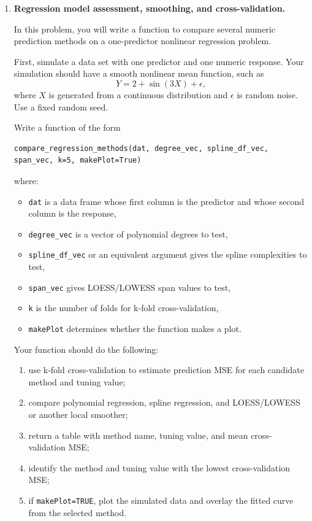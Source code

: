 \documentclass[11pt]{article}
\begin{document}
\begin{enumerate}

\item \textbf{Regression model assessment, smoothing, and cross-validation.}

In this problem, you will write a function to compare several numeric prediction methods on a one-predictor nonlinear regression problem.

First, simulate a data set with one predictor and one numeric response. Your simulation should have a smooth nonlinear mean function, such as
\[
Y = 2 + \sin(3X) + \epsilon,
\]
where \(X\) is generated from a continuous distribution and \(\epsilon\) is random noise. Use a fixed random seed.

Write a function of the form

\begin{lstlisting}
compare_regression_methods(dat, degree_vec, spline_df_vec, span_vec, k=5, makePlot=True)
\end{lstlisting}

where:

\begin{itemize}
    \item \texttt{dat} is a data frame whose first column is the predictor and whose second column is the response,
    \item \texttt{degree\_vec} is a vector of polynomial degrees to test,
    \item \texttt{spline\_df\_vec} or an equivalent argument gives the spline complexities to test,
    \item \texttt{span\_vec} gives LOESS/LOWESS span values to test,
    \item \texttt{k} is the number of folds for k-fold cross-validation,
    \item \texttt{makePlot} determines whether the function makes a plot.
\end{itemize}

Your function should do the following:

\begin{enumerate}[label=(\alph*)]
    \item use k-fold cross-validation to estimate prediction MSE for each candidate method and tuning value;
    \item compare polynomial regression, spline regression, and LOESS/LOWESS or another local smoother;
    \item return a table with method name, tuning value, and mean cross-validation MSE;
    \item identify the method and tuning value with the lowest cross-validation MSE;
    \item if \texttt{makePlot=TRUE}, plot the simulated data and overlay the fitted curve from the selected method.
\end{enumerate}


\end{enumerate}
\end{document}
